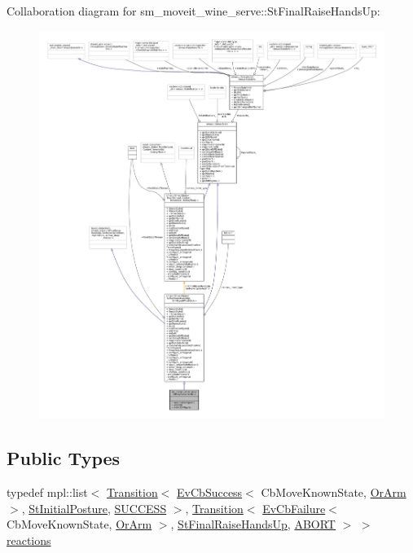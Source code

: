 Collaboration diagram for sm\+\_\+moveit\+\_\+wine\+\_\+serve\+:\+:St\+Final\+Raise\+Hands\+Up\+:
\nopagebreak
\begin{figure}[H]
\begin{center}
\leavevmode
\includegraphics[width=350pt]{structsm__moveit__wine__serve_1_1StFinalRaiseHandsUp__coll__graph}
\end{center}
\end{figure}
\subsection*{Public Types}
\begin{DoxyCompactItemize}
\item 
typedef mpl\+::list$<$ \hyperlink{classsmacc_1_1Transition}{Transition}$<$ \hyperlink{structsmacc_1_1EvCbSuccess}{Ev\+Cb\+Success}$<$ Cb\+Move\+Known\+State, \hyperlink{classsm__moveit__wine__serve_1_1OrArm}{Or\+Arm} $>$, \hyperlink{structsm__moveit__wine__serve_1_1StInitialPosture}{St\+Initial\+Posture}, \hyperlink{structsmacc_1_1default__transition__tags_1_1SUCCESS}{S\+U\+C\+C\+E\+SS} $>$, \hyperlink{classsmacc_1_1Transition}{Transition}$<$ \hyperlink{structsmacc_1_1EvCbFailure}{Ev\+Cb\+Failure}$<$ Cb\+Move\+Known\+State, \hyperlink{classsm__moveit__wine__serve_1_1OrArm}{Or\+Arm} $>$, \hyperlink{structsm__moveit__wine__serve_1_1StFinalRaiseHandsUp}{St\+Final\+Raise\+Hands\+Up}, \hyperlink{structsmacc_1_1default__transition__tags_1_1ABORT}{A\+B\+O\+RT} $>$ $>$ \hyperlink{structsm__moveit__wine__serve_1_1StFinalRaiseHandsUp_a03e82b7bd0267c500b96766319ed6e63}{reactions}
\end{DoxyCompactItemize}
